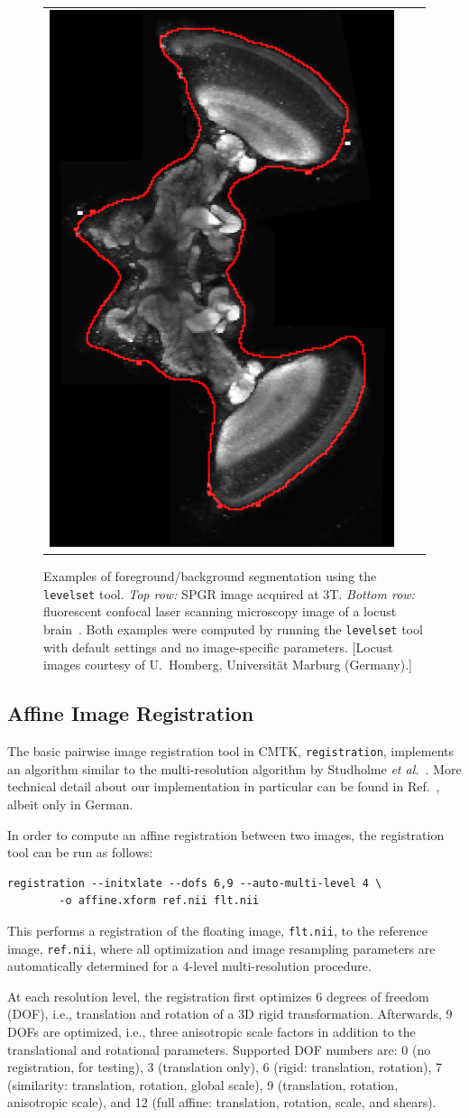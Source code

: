 \documentclass{InsightArticle}
\begin{document}
\begin{figure}[tb]
\begin{center}
\begin{tabular}{ccc}
\includegraphics[width=.3\linewidth]{img/levelset_locust_ovl}
\end{tabular}
\end{center}
\caption{Examples of foreground/background segmentation using the {\tt
levelset} tool. {\em Top row:\/} SPGR image acquired at 3T. {\em Bottom
row:\/} fluorescent confocal laser scanning microscopy image of a locust
brain~\cite{KuryRohlKrof:2008}. Both examples were computed by running the
{\tt levelset} tool with default settings and no image-specific
parameters. [Locust images courtesy of U.~Homberg, Universit\"at Marburg
(Germany).]  }
\label{fig:Levelset}
\end{figure}

\subsection{Affine Image Registration}

The basic pairwise image registration tool in CMTK, \verb|registration|,
implements an algorithm similar to the multi-resolution algorithm by Studholme
{\em et al.\/}~\cite{StudHillHawk:1997}. More technical detail about our
implementation in particular can be found in Ref.~\cite{Rohlfing:2000}, albeit
only in German.

In order to compute an affine registration between two images, the
registration tool can be run as follows:
\begin{verbatim}
registration --initxlate --dofs 6,9 --auto-multi-level 4 \
        -o affine.xform ref.nii flt.nii
\end{verbatim}
This performs a registration of the floating image, \verb|flt.nii|, to the
reference image, \verb|ref.nii|, where all optimization and image resampling
parameters are automatically determined for a 4-level multi-resolution
procedure. 

At each resolution level, the registration first optimizes 6 degrees of
freedom (DOF), i.e., translation and rotation of a 3D rigid
transformation. Afterwards, 9 DOFs are optimized, i.e., three anisotropic
scale factors in addition to the translational and rotational
parameters. Supported DOF numbers are: 0 (no registration, for testing),
3 (translation only), 6 (rigid: translation, rotation),  7 (similarity:
translation, rotation, global scale), 9 (translation, rotation, anisotropic
scale), and 12 (full affine: translation, rotation, scale, and shears).
\end{document}
